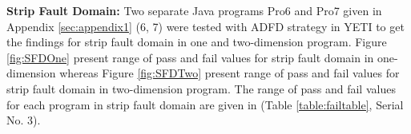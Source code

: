 


\noindent \textbf{Strip Fault Domain:} Two separate Java programs Pro6 and Pro7 given in Appendix \ref{sec:appendix1} (6, 7) were tested with ADFD strategy in YETI to get the findings for strip fault domain in one and two-dimension program. Figure \ref{fig:SFDOne} present range of pass and fail values for strip fault domain in one-dimension whereas Figure \ref{fig:SFDTwo} present range of pass and fail values for strip fault domain in two-dimension program. The range of pass and fail values for each program in strip fault domain are given in (Table \ref{table:failtable}, Serial No. 3).


